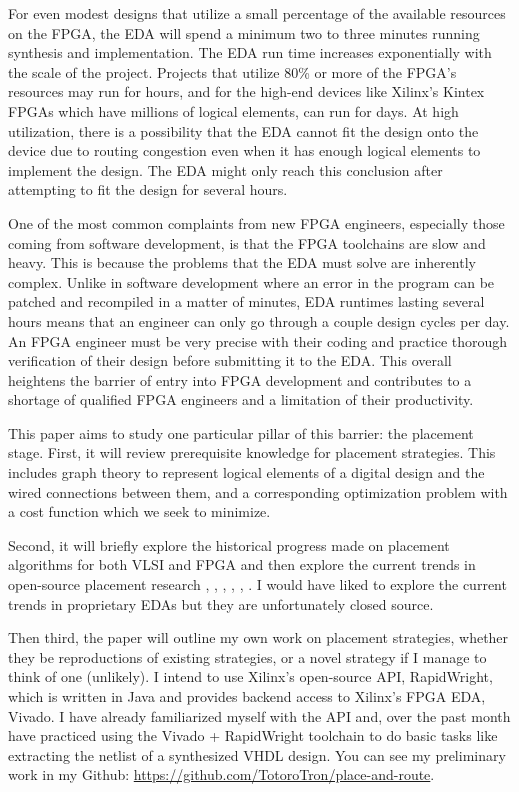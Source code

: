 \documentclass{article}
\begin{document}
    For even modest designs that utilize a small percentage of the available resources on the FPGA, the EDA will spend a minimum two to three minutes running synthesis and implementation.
    The EDA run time increases exponentially with the scale of the project. 
    Projects that utilize 80\% or more of the FPGA's resources may run for hours, and for the high-end devices like Xilinx's Kintex FPGAs which have millions of logical elements, can run for days.
    At high utilization, there is a possibility that the EDA cannot fit the design onto the device due to routing congestion even when it has enough logical elements to implement the design. 
    The EDA might only reach this conclusion after attempting to fit the design for several hours. 

    One of the most common complaints from new FPGA engineers, especially those coming from software development, is that the FPGA toolchains are slow and heavy.
    This is because the problems that the EDA must solve are inherently complex.
    Unlike in software development where an error in the program can be patched and recompiled in a matter of minutes, EDA runtimes lasting several hours means that an engineer can only go through a couple design cycles per day. 
    An FPGA engineer must be very precise with their coding and practice thorough verification of their design before submitting it to the EDA.
    This overall heightens the barrier of entry into FPGA development and contributes to a shortage of qualified FPGA engineers and a limitation of their productivity. 

    This paper aims to study one particular pillar of this barrier: the placement stage. 
    First, it will review prerequisite knowledge for placement strategies. 
    This includes graph theory to represent logical elements of a digital design and the wired connections between them, and a corresponding optimization problem with a cost function which we seek to minimize. 

    Second, it will briefly explore the historical progress made on placement algorithms for both VLSI and FPGA and then explore the current trends in open-source placement research 
    \cite{Yosys}, \cite{AMFPlacer2}, \cite{RapidLayout}, \cite{RapidStream}, \cite{DREAMPlace}, \cite{DREAMPlaceFPGA}.
    I would have liked to explore the current trends in proprietary EDAs but they are unfortunately closed source.

    Then third, the paper will outline my own work on placement strategies, whether they be reproductions of existing strategies, or a novel strategy if I manage to think of one (unlikely). 
    I intend to use Xilinx's open-source API, RapidWright, which is written in Java and provides backend access to Xilinx's FPGA EDA, Vivado. 
    I have already familiarized myself with the API and, over the past month have practiced using the Vivado + RapidWright toolchain to do basic tasks like extracting the netlist of a synthesized VHDL design.
    You can see my preliminary work in my Github: \url{https://github.com/TotoroTron/place-and-route}.
\end{document}
